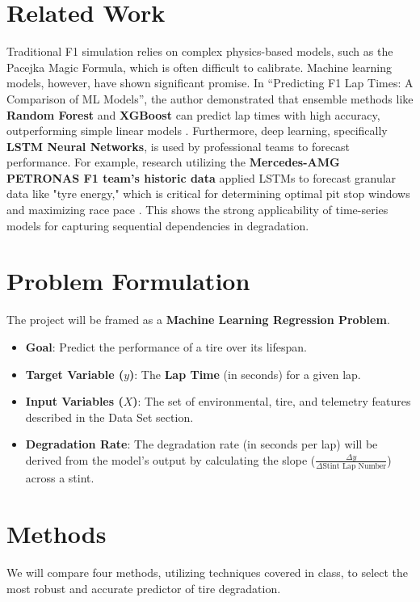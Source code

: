 \documentclass[english]{article}
\begin{document}
\section{Related Work}
Traditional F1 simulation relies on complex physics-based models, such as the Pacejka Magic Formula, which is often difficult to calibrate. Machine learning models, however, have shown significant promise. In \textquotedblleft Predicting F1 Lap Times: A Comparison of ML Models\textquotedblright, the author demonstrated that ensemble methods like \textbf{Random Forest} and \textbf{XGBoost} can predict lap times with high accuracy, outperforming simple linear models \cite{f1laptimes}. Furthermore, deep learning, specifically \textbf{LSTM Neural Networks}, is used by professional teams to forecast performance. For example, research utilizing the \textbf{Mercedes-AMG PETRONAS F1 team's historic data} applied LSTMs to forecast granular data like "tyre energy," which is critical for determining optimal pit stop windows and maximizing race pace \cite{tyreenergy}. This shows the strong applicability of time-series models for capturing sequential dependencies in degradation.

\section{Problem Formulation}
The project will be framed as a \textbf{Machine Learning Regression Problem}.

\begin{itemize}
    \item \textbf{Goal}: Predict the performance of a tire over its lifespan.
    \item \textbf{Target Variable ($y$)}: The \textbf{Lap Time} (in seconds) for a given lap. 
    \item \textbf{Input Variables ($X$)}: The set of environmental, tire, and telemetry features described in the Data Set section.
    \item \textbf{Degradation Rate}: The degradation rate (in seconds per lap) will be derived from the model's output by calculating the slope ($\frac{\Delta y}{\Delta \text{Stint Lap Number}}$) across a stint.
\end{itemize}


\section{Methods}
We will compare four methods, utilizing techniques covered in class, to select the most robust and accurate predictor of tire degradation.
\end{document}
